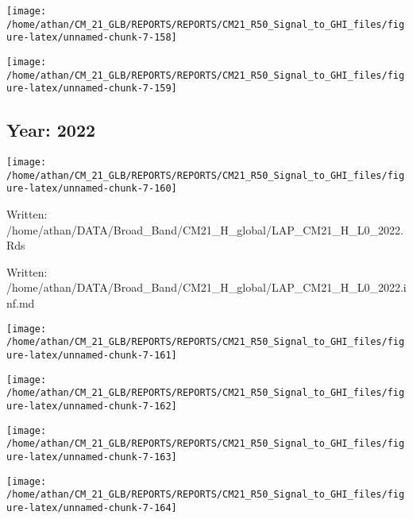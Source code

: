 \documentclass[
  11pt,
  a4paper,oneside]{article}
\begin{document}
\begin{center}\texttt{[image: /home/athan/CM\_21\_GLB/REPORTS/REPORTS/CM21\_R50\_Signal\_to\_GHI\_files/figure-latex/unnamed-chunk-7-158]} \end{center}

\begin{center}\texttt{[image: /home/athan/CM\_21\_GLB/REPORTS/REPORTS/CM21\_R50\_Signal\_to\_GHI\_files/figure-latex/unnamed-chunk-7-159]} \end{center}

\FloatBarrier

\newpage

\hypertarget{year-2022}{%
\subsection{Year: 2022}\label{year-2022}}

\begin{center}\texttt{[image: /home/athan/CM\_21\_GLB/REPORTS/REPORTS/CM21\_R50\_Signal\_to\_GHI\_files/figure-latex/unnamed-chunk-7-160]} \end{center}

Written: /home/athan/DATA/Broad\_Band/CM21\_H\_global/LAP\_CM21\_H\_L0\_2022.Rds

Written: /home/athan/DATA/Broad\_Band/CM21\_H\_global/LAP\_CM21\_H\_L0\_2022.inf.md

\begin{center}\texttt{[image: /home/athan/CM\_21\_GLB/REPORTS/REPORTS/CM21\_R50\_Signal\_to\_GHI\_files/figure-latex/unnamed-chunk-7-161]} \end{center}

\begin{center}\texttt{[image: /home/athan/CM\_21\_GLB/REPORTS/REPORTS/CM21\_R50\_Signal\_to\_GHI\_files/figure-latex/unnamed-chunk-7-162]} \end{center}

\begin{center}\texttt{[image: /home/athan/CM\_21\_GLB/REPORTS/REPORTS/CM21\_R50\_Signal\_to\_GHI\_files/figure-latex/unnamed-chunk-7-163]} \end{center}

\begin{center}\texttt{[image: /home/athan/CM\_21\_GLB/REPORTS/REPORTS/CM21\_R50\_Signal\_to\_GHI\_files/figure-latex/unnamed-chunk-7-164]} \end{center}
\end{document}
